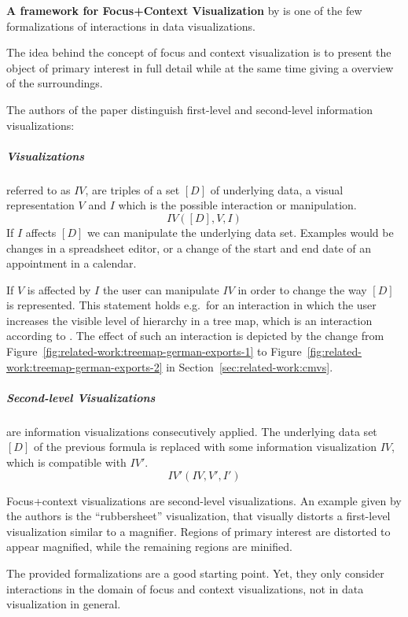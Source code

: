 \textbf{A framework for Focus+Context Visualization} by \textcite{Bjork1999} is one of the few formalizations of interactions in data visualizations.

The idea behind the concept of focus and context visualization is to present the object of primary interest in full detail while at the same time giving a overview of the surroundings.

The authors of the paper distinguish first-level and second-level information visualizations:
\subparagraph{Visualizations} referred to as $IV$, are triples of a set $[D]$ of underlying data, a visual representation $V$ and $I$ which is the possible interaction or manipulation.
\begin{equation}
  IV([D], V, I)
\end{equation}
If $I$ affects $[D]$ we can manipulate the underlying data set.
Examples would be changes in a spreadsheet editor, or a change of the start and end date of an appointment in a calendar.

If $V$ is affected by $I$ the user can manipulate $IV$ in order to change the way $[D]$ is represented.
This statement holds e.g.\ for an interaction in which the user increases the visible level of hierarchy in a tree map, which is an  interaction according to \textcite{Yi2007}.
The effect of such an interaction is depicted by the change from Figure~\ref{fig:related-work:treemap-german-exports-1} to Figure~\ref{fig:related-work:treemap-german-exports-2} in Section~\ref{sec:related-work:cmvs}.

\subparagraph{Second-level Visualizations} are information visualizations consecutively applied.
The underlying data set $[D]$ of the previous formula is replaced with some information visualization $IV$, which is compatible with $IV'$.
\begin{equation}
  IV'(IV, V', I')
\end{equation}

Focus+context visualizations are second-level visualizations.
An example given by the authors is the  ``rubbersheet'' visualization, that visually distorts a first-level visualization similar to a magnifier.
Regions of primary interest are distorted to appear magnified, while the remaining regions are minified.

The provided formalizations are a good starting point.
Yet, they only consider interactions in the domain of focus and context visualizations, not in data visualization in general.


